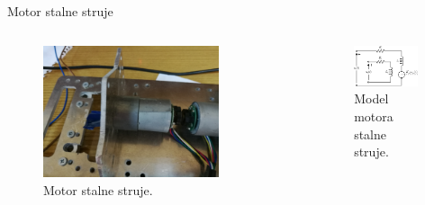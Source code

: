 \documentclass[aspectratio=169,xcolor=dvipsnames]{beamer}
\begin{document}
\begin{frame}{Motor stalne struje}
	\begin{columns}[c]
    \begin{column}{.5\textwidth}
    \begin{figure}
        \centering
        \includegraphics[width=0.8\textwidth]{fig/DCmotor.jpg}
        \caption{Motor stalne struje.}
    \end{figure}      
    \end{column}
    \begin{column}{.5\textwidth}
    \begin{figure}
        \centering
        \includegraphics[width=0.9\textwidth]{fig/DCmotor.pdf}
        \caption{Model motora stalne struje.}
    \end{figure}
    \end{column}
\end{columns}
	
\end{frame}

\end{document}
